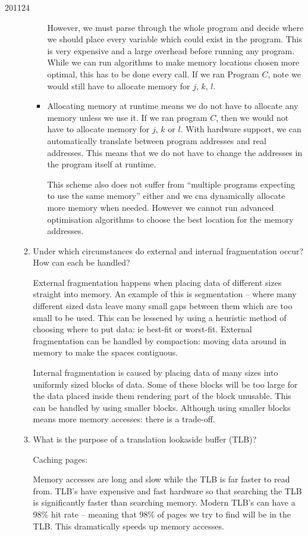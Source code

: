 \documentclass[10pt,\jkfside,a4paper]{article}
\begin{document}
\begin{examquestion}{2011}{2}{4}
\begin{enumerate}
\begin{enumerate}
\begin{itemize}
However, we must parse through the whole program and 
decide where we should place every variable which could exist in the program. This is 
very expensive and a large overhead before running any program. While we can run algorithms 
to make memory locations chosen more optimal, this has to be done every call.
If we ran Program $C$, note we would still have to allocate memory for $j$, $k$, $l$.

\item Allocating memory at runtime means we do not have to allocate any memory 
unless we use it. If we ran program $C$, then we would not have to allocate memory 
for $j$, $k$ or $l$. With hardware support, we can automatically translate between program 
addresses and real addresses. This means that we do not have to change the addresses 
in the program itself at runtime. 

This scheme also does not suffer from ``multiple programs 
expecting to use the same memory'' either and we cna dynamically allocate more memory 
when needed. However we cannot run advanced optimisation algorithms to choose the best 
location for the memory addresses.

\end{itemize}

\item Under which circumstances do external and internal fragmentation occur?
How can each be handled?

External fragmentation happens when placing data of different sizes straight into memory. 
An example of this is segmentation -- where many different sized data leave many small 
gaps between them which are too small to be used. This can be lessened by using a 
heuristic method of choosing where to put data: ie best-fit or worst-fit. External 
fragmentation can be handled by compaction: moving data around in memory to make the 
spaces contiguous.

Internal fragmentation is caused by placing data of many sizes into uniformly sized blocks of 
data. Some of these blocks will be too large for the data placed inside them rendering 
part of the block unusable. This can be handled by using smaller blocks. Although using 
smaller blocks means more memory accesses: there is a trade-off.

\item What is the purpose of a translation lookaside buffer (TLB)?

Caching pages:

Memory accesses are long and slow while the TLB is far faster to read from. TLB's have 
expensive and fast hardware so that searching the TLB is significantly faster than 
searching memory. Modern TLB's can have a 98\% hit rate -- meaning that 98\% of pages we 
try to find will be in the TLB. This dramatically speeds up memory accesses.


\end{enumerate}
\end{enumerate}
\end{examquestion}
\end{document}
